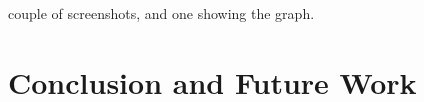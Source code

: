 \documentclass[11pt]{article}
\begin{document}
couple of screenshots, and one showing the graph.



\section{Conclusion and Future Work}





\end{document}

